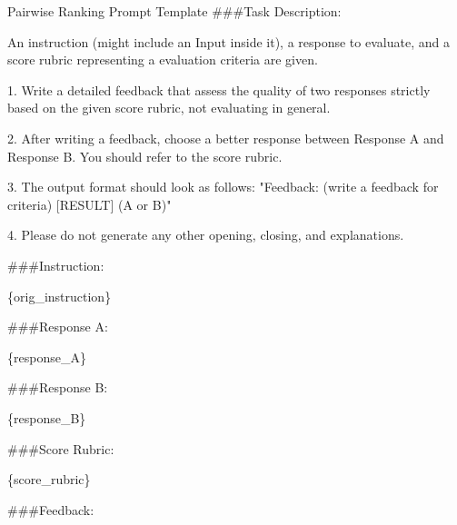 \documentclass[11pt]{article}
\begin{document}
\begin{mybox}{Pairwise Ranking Prompt Template}
\#\#\#Task Description:

An instruction (might include an Input inside it), a response to evaluate, and a score rubric representing a evaluation criteria are given.

1. Write a detailed feedback that assess the quality of two responses strictly based on the given score rubric, not evaluating in general.

2. After writing a feedback, choose a better response between Response A and Response B. You should refer to the score rubric.

3. The output format should look as follows: "Feedback: (write a feedback for criteria) [RESULT] (A or B)"

4. Please do not generate any other opening, closing, and explanations.

\#\#\#Instruction:

\{orig\_instruction\}

\#\#\#Response A:

\{response\_A\}

\#\#\#Response B:

\{response\_B\}

\#\#\#Score Rubric:

\{score\_rubric\}

\#\#\#Feedback:
\end{mybox}
\end{document}

